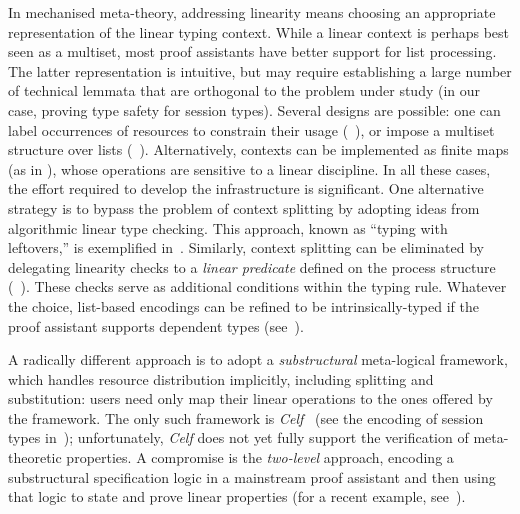 \documentclass[runningheads]{llncs}
\begin{document}
In mechanised meta-theory, addressing linearity means choosing an appropriate
representation of the linear typing context.  While a linear context is perhaps
best seen as a multiset, most proof assistants have better support for list
processing.  The latter representation is intuitive, but may require
establishing a large number of technical lemmata that are orthogonal to the
problem under study (in our case, proving type safety for session types).
Several designs are possible: one can label
occurrences of resources to constrain their usage (\eg~\cite{CicconeP20}), or impose a multiset structure over lists
(\eg~\cite{Danielsson12,ChaudhuriLR19}). Alternatively, contexts can be
implemented as finite maps (as in \cite{Castro2020}), whose operations are
sensitive to a linear discipline. In all these cases, the effort required to
develop the infrastructure is significant.
One alternative strategy is to bypass the problem of context splitting
by adopting ideas from algorithmic linear type checking. This
approach, known as ``typing with leftovers,'' is exemplified
in~\cite{DBLP:conf/forte/ZalakainD21}.
Similarly, context splitting can be eliminated by delegating linearity checks to a
\emph{linear predicate} defined on the process structure (\eg~\cite{BP23}).
These checks serve as additional conditions within the typing rule.
Whatever the choice, list-based encodings can be refined to be intrinsically-typed if the
proof assistant supports dependent types
(see~\cite{Thiemann2019,CicconeP20,RouvoetPKV20}).

A radically different approach is to adopt a \emph{substructural}
meta-logical framework, which handles resource
distribution implicitly, including splitting and
substitution: users need only map their linear operations to the
ones offered by the framework.  The only such framework is
\emph{Celf}~\cite{Schack-Nielsen:IJCAR08} (see the encoding of session
types in~\cite{Bock2016}); unfortunately, \emph{Celf} does not yet
fully support the verification of meta-theoretic properties.  A
compromise is the \emph{two-level} approach, \ie encoding a
substructural specification logic in a mainstream proof assistant and
then using that logic to state and prove linear properties (for a
recent example, see~\cite{Felty:MSCS21}). 
\end{document}
